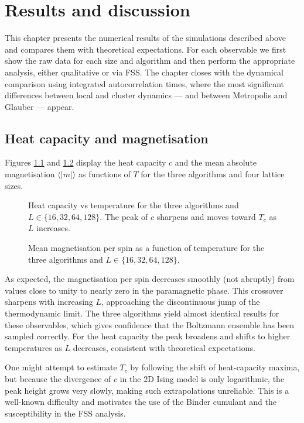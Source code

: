 \chapter{Results and discussion} \label{chap:resultados}
This chapter presents the numerical results of the simulations described above and compares them with theoretical expectations. For each observable we first show the raw data for each size and algorithm and then perform the appropriate analysis, either qualitative or via FSS. The chapter closes with the dynamical comparison using integrated autocorrelation times, where the most significant differences between local and cluster dynamics — and between Metropolis and Glauber — appear.

\section{Heat capacity and magnetisation}

Figures \ref{fig:c} and \ref{fig:m} display the heat capacity $c$ and the mean absolute magnetisation $\langle|m|\rangle$ as functions of $T$ for the three algorithms and four lattice sizes.

\begin{figure}
  \centering
  
  \caption{Heat capacity vs temperature for the three algorithms and $L\in\{16,32,64,128\}$. The peak of $c$ sharpens and moves toward $T_c$ as $L$ increases.}
  \label{fig:c}
\end{figure}
\begin{figure}
  \centering
  
  \caption{Mean magnetisation per spin as a function of temperature for the three algorithms and $L\in\{16,32,64,128\}$.}
  \label{fig:m}
\end{figure}

As expected, the magnetisation per spin decreases smoothly (not abruptly) from values close to unity to nearly zero in the paramagnetic phase. This crossover sharpens with increasing $L$, approaching the discontinuous jump of the thermodynamic limit. The three algorithms yield almost identical results for these observables, which gives confidence that the Boltzmann ensemble has been sampled correctly. For the heat capacity the peak broadens and shifts to higher temperatures as $L$ decreases, consistent with theoretical expectations.

One might attempt to estimate $T_c$ by following the shift of heat-capacity maxima, but because the divergence of $c$ in the 2D Ising model is only logarithmic, the peak height grows very slowly, making such extrapolations unreliable. This is a well-known difficulty and motivates the use of the Binder cumulant and the susceptibility in the FSS analysis.

